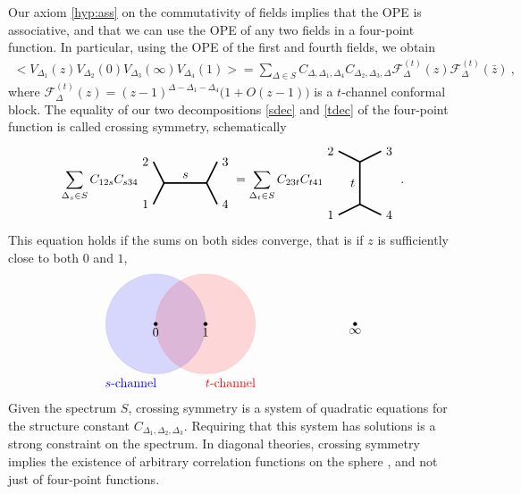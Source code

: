 \documentclass[12pt, a4paper]{article}
\theoremstyle{break}
\begin{document}
Our axiom \ref{hyp:ass} on the commutativity of fields implies that the OPE is associative, and that we can use the OPE of any two fields in a four-point function. In particular, using the OPE of the first and fourth fields, we obtain 
\begin{align}
 \Big<V_{\Delta_1}(z)V_{\Delta_2}(0)V_{\Delta_3}(\infty)V_{\Delta_4}(1)\Big>
 =\sum_{\Delta\in S} C_{\Delta,\Delta_1,\Delta_4} C_{\Delta_2,\Delta_3,\Delta}   \mathcal{F}^{(t)}_\Delta(z) \mathcal{F}^{(t)}_\Delta(\bar z)\ ,
 \label{tdec}
\end{align}
where $\mathcal{F}^{(t)}_\Delta(z) = (z-1)^{\Delta-\Delta_1-\Delta_4}\Big(1+O(z-1)\Big)$ is a $t$-channel conformal block.
The equality of our two decompositions \eqref{sdec} and \eqref{tdec} of the four-point function is called crossing symmetry, schematically 
\begin{align}
 \sum_{\Delta_s\in S} C_{12s} C_{s34} 
 \begin{tikzpicture}[baseline=(current  bounding  box.center), very thick, scale = .3]
\draw (-1,2) node [left] {$2$} -- (0,0) -- node [above] {$s$} (4,0) -- (5,2) node [right] {$3$};
\draw (-1,-2) node [left] {$1$} -- (0,0);
\draw (4,0) -- (5,-2) node [right] {$4$};
\end{tikzpicture} 
= \sum_{\Delta_t\in S} C_{23t}C_{t41} 
\begin{tikzpicture}[baseline=(current  bounding  box.center), very thick, scale = .3]
 \draw (-2,3) node [left] {$2$} -- (0,2) -- node [left] {$t$} (0,-2) -- (-2, -3) node [left] {$1$};
\draw (0,2) -- (2,3) node [right] {$3$};
\draw (0,-2) -- (2, -3) node [right] {$4$};
\end{tikzpicture}
\ .
\label{csd}
\end{align}
This equation holds if the sums on both sides converge, that is if $z$ is sufficiently close to both $0$ and $1$,
\begin{align}
\begin{tikzpicture}[scale = 1.4, baseline=(current  bounding  box.center)]
 \filldraw[blue, opacity = .15] (0, 0) circle [radius = 1];
 \filldraw[red, opacity = .15] (1, 0) circle [radius = 1];
 \filldraw (0, 0) circle [radius = 1pt] node [below] {$0$};
 \filldraw (1, 0) circle [radius = 1pt] node [below] {$1$};
 \filldraw (4, 0) circle [radius = 1pt] node [below] {$\infty$};
 \node[below, blue] at (-.5, -1) {$s$-channel};
 \node[below, red] at (1.5, -1) {$t$-channel};
\end{tikzpicture}
\end{align}
Given the spectrum $S$, crossing symmetry is a system of quadratic equations for the structure constant $C_{\Delta_1,\Delta_2,\Delta_3}$. Requiring that this system has solutions is a strong constraint on the spectrum. 
In diagonal theories, crossing symmetry implies the existence of arbitrary correlation functions on the sphere \cite{ms89b}, and not just of four-point functions.
\end{document}
